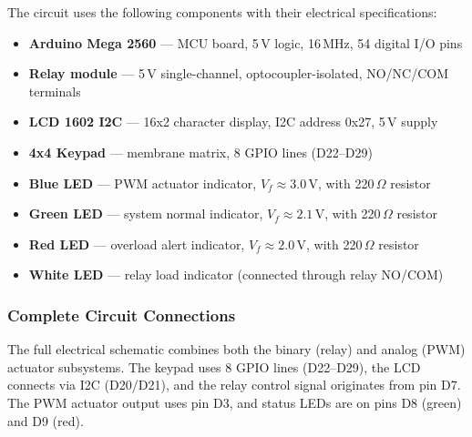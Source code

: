 The circuit uses the following components with their electrical specifications:

\begin{itemize}
    \item \textbf{Arduino Mega 2560} --- MCU board, 5\,V logic, 16\,MHz, 54 digital I/O pins
    \item \textbf{Relay module} --- 5\,V single-channel, optocoupler-isolated, NO/NC/COM terminals
    \item \textbf{LCD 1602 I2C} --- 16x2 character display, I2C address 0x27, 5\,V supply
    \item \textbf{4x4 Keypad} --- membrane matrix, 8 GPIO lines (D22--D29)
    \item \textbf{Blue LED} --- PWM actuator indicator, $V_f \approx 3.0$\,V, with 220\,$\Omega$ resistor
    \item \textbf{Green LED} --- system normal indicator, $V_f \approx 2.1$\,V, with 220\,$\Omega$ resistor
    \item \textbf{Red LED} --- overload alert indicator, $V_f \approx 2.0$\,V, with 220\,$\Omega$ resistor
    \item \textbf{White LED} --- relay load indicator (connected through relay NO/COM)
\end{itemize}

\subsubsection{Complete Circuit Connections}

The full electrical schematic combines both the binary (relay) and analog (PWM) actuator subsystems. The keypad uses 8 GPIO lines (D22--D29), the LCD connects via I2C (D20/D21), and the relay control signal originates from pin D7. The PWM actuator output uses pin D3, and status LEDs are on pins D8 (green) and D9 (red).

